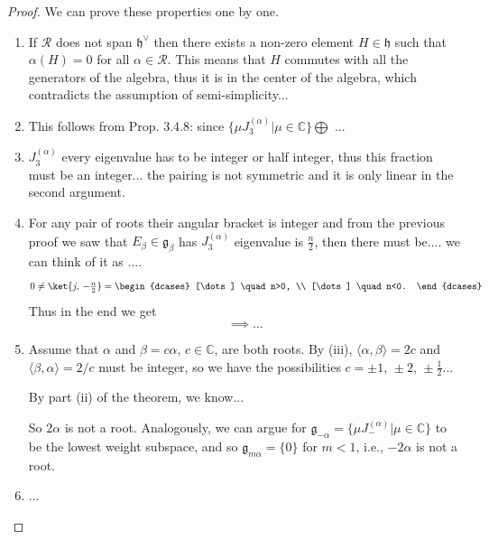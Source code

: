 \begin{proof}
    We can prove these properties one by one.
    \begin{enumerate}[label=(\roman*)]
        \item If \(\mathcal{R} \) does not span \(\mathfrak{h}^{\vee}\) then there exists a non-zero element \(H \in \mathfrak{h}\) such that \(\alpha(H) = 0\) for all \(\alpha \in \mathcal{R}\). This means that \(H\) commutes with all the generators of the algebra, thus it is in the center of the algebra, which contradicts the assumption of semi-simplicity...
        \item This follows from Prop. 3.4.8: since \(\{\mu J_3^{(\alpha)} | \mu \in \mathbb{C} \} \bigoplus\) ...
        \item \(J_3^{(\alpha)}\) every eigenvalue has to be integer or half integer, thus this fraction must be an integer... the pairing is not symmetric and it is only linear in the second argument.
        \item For any pair of roots their angular bracket is integer and from the previous proof we saw that \(E_{\beta} \in \mathfrak{g}_{\beta}\) has \(J_3^{(\alpha)}\) eigenvalue is \(\tfrac{n}{2}\), then there must be.... we can think of it as ....
              \[
                  0 \neq \ket{j,\,-\tfrac{n}{2}} = \begin{dcases}
                      [\dots ] \quad n>0, \\
                      [\dots ] \quad n<0.
                  \end{dcases}
              \]
              Thus in the end we get
              \[
                  \implies \dots
              \]
        \item Assume that \(\alpha\) and \(\beta = c \alpha\), \(c \in \mathbb{C}\), are both roots. By (iii), \(\langle \alpha, \beta \rangle = 2c\) and\( \langle \beta, \alpha \rangle = 2/c \) must be integer, so we have the possibilities \(c = \pm 1, \, \pm 2,\, \pm \tfrac{1}{2}\)...

              By part (ii) of the theorem, we know...

              So \(2 \alpha\) is not a root. Analogously, we can argue for \(\mathfrak{g}_{-\alpha} = \{\mu J_{-}^{(\alpha)} | \mu \in \mathbb{C} \}\) to be the lowest weight subspace, and so \(\mathfrak{g}_{m \alpha} = \{0\}\) for \(m < 1\), i.e., \(-2 \alpha\) is not a root.
        \item ...
    \end{enumerate}
\end{proof}

